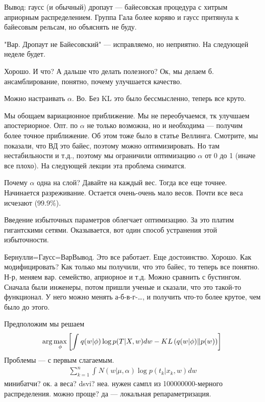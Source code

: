 \documentclass{minimal}
\begin{document}
Вывод: гаусс (и обычный) дропаут --- байесовская процедура с хитрым априорным распределением.
Группа Гала более коряво и гаусс притянула к байесовым рельсам, но объяснять не буду.

"Вар. Дропаут не Байесовский" --- исправляемо, но неприятно. На следующей неделе будет.

Хорошо. И что? А дальше что делать полезного? Ок, мы делаем б. ансамблирование, понятно, почему улучшается качество.

Можно настраивать $\alpha$. Во. Без KL это было бессмысленно, теперь все круто.

Мы обощаем вариационное приближение. Мы не переобучаемся, тк улучшаем апостериорное. Опт. по $\alpha$ не только возможна, но и необходима --- получим более точное приближение. Об этом тоже было в статье Веллинга. Смотрите, мы показали, что ВД это байес, поэтому можно оптимизировать. Но там нестабильности и т.д., поэтому мы ограничили оптимизацию $\alpha$ от 0 до 1 (иначе все плохо).
На следующей лекции эта проблема сниматся.

Почему $\alpha$ одна на слой? Давайте на каждый вес. Тогда все еще точнее. Начинается разреживание. Остается очень-очень мало весов. Почти все веса исчезают ($99.9\%$).

Введение избыточных параметров облегчает оптимизацию. За это платим гигантскими сетями. Оказывается, вот один способ устранения этой избыточности.

Бернулли=Гаусс=ВарВывод. Это все работает. Еще достоинство. Хорошо. Как модифицировать? Как только мы получили, что это байес, то теперь все понятно. Н-р, меняем вар. семейство, априорное и т.д. Можно сравнить с бустингом. Сначала были инженеры, потом пришли ученые и сказали, что это такой-то функционал. У него можно менять а-б-в-г-\dots, и получить что-то более крутое, чем было до этого.

Предположим мы решаем \[
\arg\max_\phi\left[\int_{}^{} {q(w|\phi)\log p(T|X,w)dw}-KL\left(q(w|\phi)\|p(w)\right)\right]\\
\]
Проблемы --- с первым слагаемым.
\begin{gather*}
  \sum_{k=1}^{n} {\int_{}^{} {N(w|\mu,\alpha)\log p(t_k|x_k,w)dw}}
\end{gather*}
минибатчи? ок. а веса? dsvi? неа. нужен сампл из 100000000-мерного распределения. можно проще? да --- локальная репараметризация.
\end{document}
